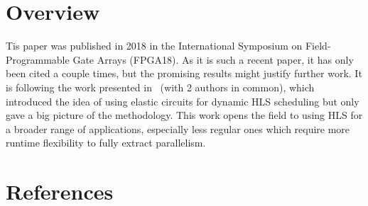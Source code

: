 \documentclass{article}
\begin{document}
\section{Overview}
Tis paper was published in 2018 in the International Symposium on Field-Programmable Gate Arrays (FPGA18).
As it is such a recent paper, it has only been cited a couple times, but the promising results might justify further work.
It is following the work presented in~\cite{DBLP:conf/acssc/JosipovicBI17} (with 2 authors in common), which introduced the idea of using elastic circuits for dynamic HLS scheduling but only gave a big picture of the methodology.
This work opens the field to using HLS for a broader range of applications, especially less regular ones which require more runtime flexibility to fully extract parallelism.

\section{References}


\end{document}
